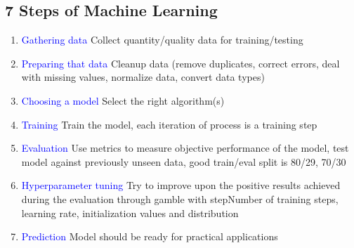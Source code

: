 \subsection{7 Steps of Machine Learning}
\begin{enumerate}
    \item \textcolor{blue}{Gathering data} Collect quantity/quality data for training/testing
    \item \textcolor{blue}{Preparing that data} Cleanup data (remove duplicates, correct errors, deal with missing values, normalize data, convert data types)
    \item \textcolor{blue}{Choosing a model} Select the right algorithm(s)
    \item \textcolor{blue}{Training} Train the model, each iteration of process is a training step
    \item \textcolor{blue}{Evaluation} Use metrics to measure objective performance of the model, test model against previously unseen data, good train/eval split is 80/29, 70/30
    \item \textcolor{blue}{Hyperparameter tuning} Try to improve upon the positive results achieved during the evaluation through gamble with stepNumber of training steps, learning rate, initialization values and distribution
    \item \textcolor{blue}{Prediction} Model should be ready for practical applications
\end{enumerate}
